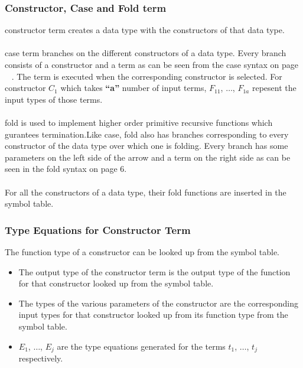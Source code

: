 \documentclass[11pt]{article}
\begin{document}
\subsubsection {Constructor, Case and Fold term}
{\sf constructor } term creates a data type with the constructors of that data type.
~~\\~~\\
{\sf case} term branches on the different constructors of a data type. Every branch consists of a constructor and a term as can be seen from the case syntax on page ~ \pageref{caseLab}. The term is executed when the corresponding constructor is selected. 
For constructor $C_1$ which takes {\bf ``a''} number of input terms, $F_{11}$, $\ldots$, $F_{1a}$ repesent the input types of those terms.
~~\\~~\\
fold is used to implement higher order primitive recursive functions which gurantees termination.Like case, fold also has branches corresponding to every constructor of the data type over which one is folding. Every branch has some parameters on the left side of the arrow and a term on the
right side as can be seen in the fold syntax on page 6.
~~\\~~\\ 
For all the constructors of a data type, their fold functions are  inserted in the symbol table.

\subsubsection {Type Equations for Constructor Term} 
The function type of a constructor can be looked up from the symbol table.
\begin{itemize}
  \item The output type of the {\sf constructor} term is the output type of the function for that constructor looked up from the symbol table. 
  \item The types of the various parameters of the constructor are the corresponding input types  for that constructor looked up from its function type from the symbol table.
  \item $E_1$, $\ldots$, $E_j$ are the type equations generated for the terms $t_1$, $\ldots$, $t_j$ respectively.
\end{itemize}
\end{document}
